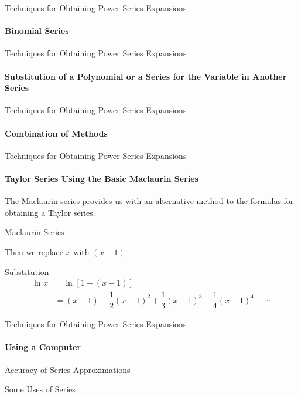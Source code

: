 \documentclass{beamer}
\begin{document}
\begin{frame}{Techniques for Obtaining Power Series Expansions}
    	\framesubtitle{Binomial Series}
\end{frame}
  
\begin{frame}{Techniques for Obtaining Power Series Expansions}
    	\framesubtitle{Substitution of a Polynomial or a Series for the Variable in Another Series}
\end{frame}
  
\begin{frame}{Techniques for Obtaining Power Series Expansions}
   	\framesubtitle{Combination of Methods}
\end{frame}
  
\begin{frame}{Techniques for Obtaining Power Series Expansions}
    \framesubtitle{Taylor Series Using the Basic Maclaurin Series}
    The Maclaurin series provides us with an alternative method to the formulas for obtaining a Taylor series.
   \begin{exampleblock}{Maclaurin Series}
   \end{exampleblock}
   Then we replace $x$ with $(x-1)$
   \begin{exampleblock}{Substitution}
   	\begin{align*}
   	    \mbox{ln\ } x&= \mbox{ln\ } [1+(x-1)] \\
	    &= (x-1)-\dfrac{1}{2}(x-1)^2+\dfrac{1}{3}(x-1)^3-\dfrac{1}{4}(x-1)^4+\cdots
	\end{align*}
   \end{exampleblock}
\end{frame}
  
\begin{frame}{Techniques for Obtaining Power Series Expansions}
    	\framesubtitle{Using a Computer}
\end{frame}
  
\begin{frame}{Accuracy of Series Approximations}
\end{frame}
  
\begin{frame}{Some Uses of Series}
\end{frame}
\end{document}
